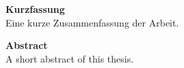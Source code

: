 \vspace*{2cm}
{\bf\Large Kurzfassung} \\ [1em] 
Eine kurze Zusammenfassung der Arbeit.

\vspace{10ex}
{\bf\Large Abstract} \\ [1em]
A short abstract of this thesis.

\cleardoublepage
